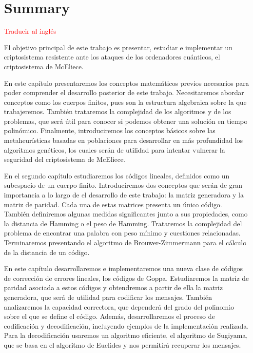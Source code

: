 \chapter*{Summary}

\textcolor{red}{Traducir al inglés}


El objetivo principal de este trabajo es presentar, estudiar e implementar un criptosistema resistente ante los ataques de los ordenadores cuánticos, el criptosistema de McEliece. 


En este capítulo presentaremos los conceptos matemáticos previos necesarios para poder comprender el desarrollo posterior de este trabajo. Necesitaremos abordar conceptos como los cuerpos finitos, pues son la estructura algebraica sobre la que trabajeremos. También trataremos la complejidad de los algoritmos y de los problemas, que será útil para conocer si podemos obtener una solución en tiempo polinómico. Finalmente, introduciremos los conceptos básicos sobre las metaheurísticas basadas en poblaciones para desarrollar en más profundidad los algoritmos genéticos, los cuales serán de utilidad para intentar vulnerar la seguridad del criptosistema de McEliece.


En el segundo capítulo estudiaremos los códigos lineales, definidos como un subespacio de un cuerpo finito. Introduciremos dos conceptos que serán de gran importancia a lo largo de el desarrollo de este trabajo: la matriz generadora y la matriz de paridad. Cada una de estas matrices presenta un único código. También definiremos algunas medidas significantes junto a sus propiedades, como la distancia de Hamming o el peso de Hamming. Trataremos la complejidad del problema de encontrar una palabra con peso mínimo y cuestiones relacionadas. Terminaremos presentando el algoritmo de Brouwer-Zimmermann para el cálculo de la distancia de un código.


En este capítulo desarrollaremos e implementaremos una nueva clase de códigos de corrección de errores lineales, los códigos de Goppa. Estudiaremos la matriz de paridad asociada a estos códigos y obtendremos a partir de ella la matriz generadora, que será de utilidad para codificar los mensajes. También analizaremos la capacidad correctora, que dependerá del grado del polinomio sobre el que se define el código. Además, desarrollaremos el proceso de codificación y decodificación, incluyendo ejemplos de la implementación realizada. Para la decodificación usaremos un algoritmo eficiente, el algoritmo de Sugiyama, que se basa en el algoritmo de Euclides y nos permitirá recuperar los mensajes.

